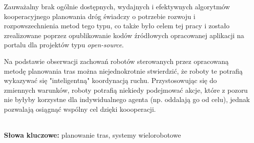 \begin{singlespacing}
Zauważalny brak ogólnie dostępnych, wydajnych i efektywnych algorytmów kooperacyjnego planowania dróg świadczy o potrzebie rozwoju i rozpowszechnienia metod tego typu, co także było celem tej pracy i zostało zrealizowane poprzez opublikowanie kodów źródłowych opracowanej aplikacji na portalu dla projektów typu {\it open-source}.

Na podstawie obserwacji zachowań robotów sterowanych przez opracowaną metodę planowania tras można niejednokrotnie stwierdzić, że roboty te potrafią wykazywać się "inteligentną" koordynacją ruchu.
Przystosowując się do zmiennych warunków, roboty potrafią niekiedy podejmować akcje, które z pozoru nie byłyby korzystne dla indywidualnego agenta (np. oddalają go od celu), jednak pozwalają osiągnąć wspólny cel dzięki koooperacji.

\flushbottom
\textbf{\\Słowa kluczowe: }planowanie tras, systemy wielorobotowe
\end{singlespacing}
